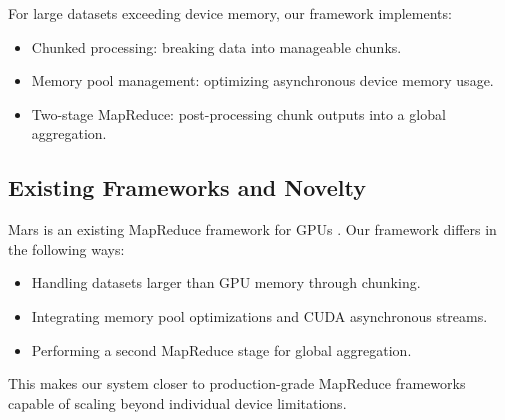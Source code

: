 \documentclass{article}
\begin{document}
For large datasets exceeding device memory, our framework implements:
\begin{itemize}
    \item Chunked processing: breaking data into manageable chunks.
    \item Memory pool management: optimizing asynchronous device memory usage.
    \item Two-stage MapReduce: post-processing chunk outputs into a global aggregation.
\end{itemize}

\subsection{Existing Frameworks and Novelty}
Mars is an existing MapReduce framework for GPUs \cite{mars}. Our framework differs in the following ways:
\begin{itemize}
    \item Handling datasets larger than GPU memory through chunking.
    \item Integrating memory pool optimizations and CUDA asynchronous streams.
    \item Performing a second MapReduce stage for global aggregation.
\end{itemize}

This makes our system closer to production-grade MapReduce frameworks capable of scaling beyond individual device limitations.
\end{document}
